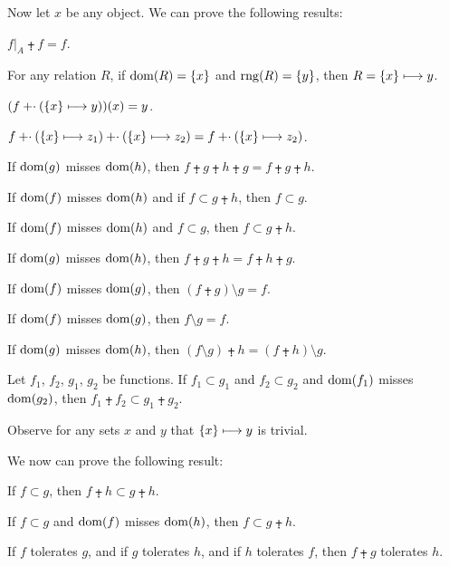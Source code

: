 \documentclass{article}
\begin{document}
Now let $x$ be any object. We can prove the following results:
\begin{thm}
\item\label{funct4:111} $f|_{A}\plusdot f=f$.
\item\label{funct4:112} For any relation $R$, if $\operatorname{dom}(R)=\{x\}$ and
  $\operatorname{rng}(R)=\{y\}$, then $R=\{x\}\longmapsto y$.
\item\label{funct4:113} $(f\mathbin{\mathord{+}\cdot}(\{x\}\longmapsto y))(x)=y$.
\item\label{funct4:114} $f\mathbin{\mathord{+}\cdot}(\{x\}\longmapsto z_{1})\mathbin{\mathord{+}\cdot}(\{x\}\longmapsto z_{2})=f\mathbin{\mathord{+}\cdot}(\{x\}\longmapsto z_{2})$.
\item\label{funct4:115} If $\operatorname{dom}(g)$ misses $\operatorname{dom}(h)$,
  then $f\plusdot g\plusdot h\plusdot g=f\plusdot g\plusdot h$.
\item\label{funct4:116} If $\operatorname{dom}(f)$ misses $\operatorname{dom}(h)$ and if $f\subset g\plusdot h$,
  then $f\subset g$.
\item\label{funct4:117} If $\operatorname{dom}(f)$ misses $\operatorname{dom}(h)$ and $f\subset g$,
  then $f\subset g\plusdot h$.
\item\label{funct4:118} If $\operatorname{dom}(g)$ misses $\operatorname{dom}(h)$, then
  $f\plusdot g\plusdot h = f\plusdot h\plusdot g$.
\item\label{funct4:119} If $\operatorname{dom}(f)$ misses $\operatorname{dom}(g)$, then $(f\plusdot g)\setminus g=f$.
\item\label{funct4:120} If $\operatorname{dom}(f)$ misses $\operatorname{dom}(g)$,
  then $f\setminus g=f$.
\item\label{funct4:121} If $\operatorname{dom}(g)$ misses $\operatorname{dom}(h)$,
  then $(f\setminus g)\plusdot h=(f\plusdot h)\setminus g$.
\item\label{funct4:122}Let $f_{1}$, $f_{2}$, $g_{1}$, $g_{2}$ be functions.
  If $f_{1}\subset g_{1}$ and $f_{2}\subset g_{2}$ and $\operatorname{dom}(f_{1})$
  misses $\operatorname{dom}(g_{2})$, then $f_{1}\plusdot f_{2}\subset g_{1}\plusdot g_{2}$.
\end{thm}

Observe for any sets $x$ and $y$ that $\{x\}\longmapsto y$ is trivial.

We now can prove the following result:
\begin{thm}
\item\label{funct4:123} If $f\subset g$, then $f\plusdot h\subset g\plusdot h$.
\item\label{funct4:124} If $f\subset g$ and $\operatorname{dom}(f)$ misses $\operatorname{dom}(h)$,
  then $f\subset g\plusdot h$.
\item\label{funct4:125} If $f$ tolerates $g$, and if $g$ tolerates $h$,
  and if $h$ tolerates $f$, then $f\plusdot g$ tolerates $h$.
\end{thm}
\end{document}
